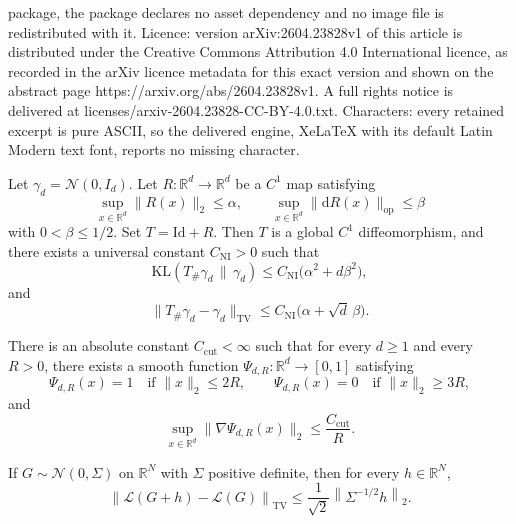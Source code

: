 \documentclass[10pt,a4paper]{amsart}
\newcommand{\Id}{\mathrm{Id}}
\newcommand{\KL}{\mathrm{KL}}
\newcommand{\Law}{\mathcal{L}}
\newcommand{\R}{\mathbb{R}}
\newcommand{\TV}{\mathrm{TV}}
\newcommand{\dd}{\mathrm{d}}
\newcommand{\norm}[1]{\left\lVert #1\right\rVert}
\newcommand{\op}{\mathrm{op}}
\begin{document}
package, the package declares no asset dependency and no image file is redistributed with it. Licence: version arXiv:2604.23828v1 of this article is distributed under the Creative Commons Attribution 4.0 International licence, as recorded in the arXiv licence metadata for this exact version and shown on the abstract page https://arxiv.org/abs/2604.23828v1. A full rights notice is delivered at licenses/arxiv-2604.23828-CC-BY-4.0.txt. Characters: every retained excerpt is pure ASCII, so the delivered engine, XeLaTeX with its default Latin Modern text font, reports no missing character.
\begin{proposition}
\label{prop:near-identity}
Let $\gamma_d=\mathcal N(0,I_d)$. Let $R:\R^d\to\R^d$ be a $C^1$ map satisfying
\[
\sup_{x\in\R^d}\|R(x)\|_2\le \alpha,
\qquad
\sup_{x\in\R^d}\|\dd R(x)\|_{\op}\le \beta
\]
with $0<\beta\le 1/2$. Set $T=\Id+R$. Then $T$ is a global $C^1$
diffeomorphism, and there exists a universal constant $C_{\mathrm{NI}}>0$ such
that
\begin{equation}
\label{eq:near-identity-kl}
\KL(T_\#\gamma_d\,\|\,\gamma_d)
\le
C_{\mathrm{NI}}\bigl(\alpha^2+d\beta^2\bigr),
\end{equation}
and
\begin{equation}
\label{eq:near-identity-tv}
\|T_\#\gamma_d-\gamma_d\|_{\TV}
\le
C_{\mathrm{NI}}\bigl(\alpha+\sqrt d\,\beta\bigr).
\end{equation}
\end{proposition}

\begin{lemma}
\label{lem:radial-cutoff}
There is an absolute constant $C_{\mathrm{cut}}<\infty$ such that for every
$d\ge 1$ and every $R>0$, there exists a smooth function
$\Psi_{d,R}:\R^d\to[0,1]$ satisfying
\[
\Psi_{d,R}(x)=1 \quad \text{if } \|x\|_2\le 2R,
\qquad
\Psi_{d,R}(x)=0 \quad \text{if } \|x\|_2\ge 3R,
\]
and
\[
\sup_{x\in\R^d}\|\nabla\Psi_{d,R}(x)\|_2
\le
\frac{C_{\mathrm{cut}}}{R}.
\]
\end{lemma}

\begin{lemma}
\label{lem:gaussian-shift}
If $G\sim \mathcal N(0,\Sigma)$ on $\R^N$ with $\Sigma$ positive definite, then for every
$h\in\R^N$,
\begin{equation}
\label{eq:gaussian-shift}
\norm{\Law(G+h)-\Law(G)}_{\TV}
\le
\frac{1}{\sqrt{2}}\norm{\Sigma^{-1/2}h}_2.
\end{equation}
\end{lemma}
\end{document}
